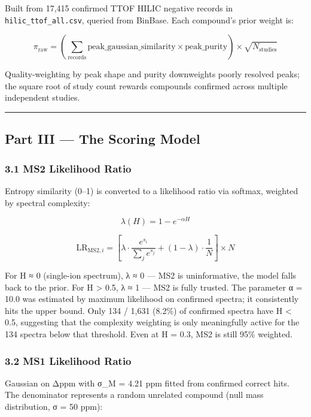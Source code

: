 Built from 17,415 confirmed TTOF HILIC negative records in
\texttt{hilic\_ttof\_all.csv}, queried from BinBase. Each compound's
prior weight is:

\[\pi_{\text{raw}} = \left(\sum_{\text{records}} \text{peak\_gaussian\_similarity} \times \text{peak\_purity}\right) \times \sqrt{N_{\text{studies}}}\]

Quality-weighting by peak shape and purity downweights poorly resolved
peaks; the square root of study count rewards compounds confirmed across
multiple independent studies.

\begin{center}\rule{0.5\linewidth}{0.5pt}\end{center}

\subsection{Part III --- The Scoring
Model}\label{part-iii-the-scoring-model}

\subsubsection{3.1 MS2 Likelihood Ratio}\label{ms2-likelihood-ratio}

Entropy similarity (0--1) is converted to a likelihood ratio via
softmax, weighted by spectral complexity:

\[\lambda(H) = 1 - e^{-\alpha H}\]

\[\text{LR}_{\text{MS2},i} = \left[\lambda \cdot \frac{e^{s_i}}{\sum_j e^{s_j}} + (1-\lambda) \cdot \frac{1}{N}\right] \times N\]

For H ≈ 0 (single-ion spectrum), λ ≈ 0 --- MS2 is uninformative, the
model falls back to the prior. For H \textgreater{} 0.5, λ ≈ 1 --- MS2
is fully trusted. The parameter α = 10.0 was estimated by maximum
likelihood on confirmed spectra; it consistently hits the upper bound.
Only 134 / 1,631 (8.2\%) of confirmed spectra have H \textless{} 0.5,
suggesting that the complexity weighting is only meaningfully active for
the 134 spectra below that threshold. Even at H = 0.3, MS2 is still 95\%
weighted.

\subsubsection{3.2 MS1 Likelihood Ratio}\label{ms1-likelihood-ratio}

Gaussian on Δppm with σ\_M = 4.21 ppm fitted from confirmed correct
hits. The denominator represents a random unrelated compound (null mass
distribution, σ = 50 ppm):

